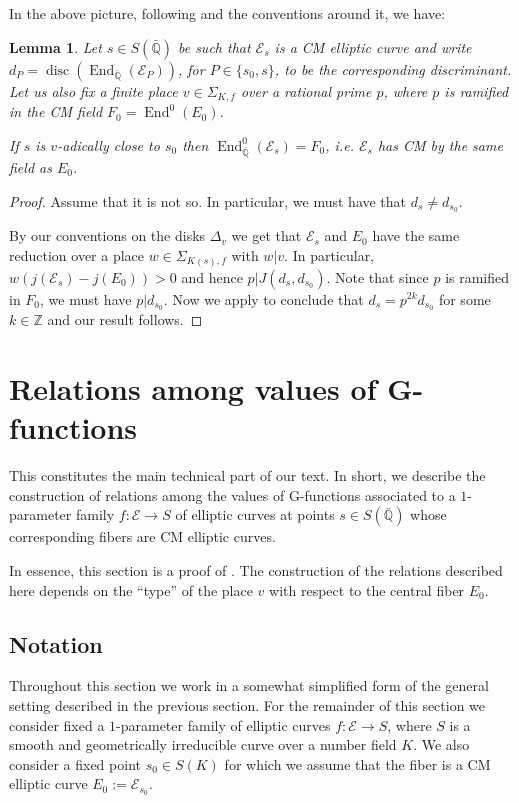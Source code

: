 \documentclass[12pt,twoside,a4paper]{article}
\theoremstyle{plain}%
\newtheorem{lemma}[theorem]{Lemma}
\DeclareMathOperator{\End}{End}
\DeclareMathOperator{\disc}{disc}
\newcommand{\Z}{\mathbb{Z}}
\newcommand{\Q}{\mathbb{Q}}
\newcommand{\CE}{\mathcal{E}}
\begin{document}
In the above picture, following  and the conventions around it, we have:
\begin{lemma}\label{lemproximityramified}
	Let $s\in S(\bar{\Q})$ be such that $\CE_s$ is a CM elliptic curve and write $d_P=\disc(\End_{\bar{\Q}}(\CE_P))$, for $P\in \{s_0,s\}$, to be the corresponding discriminant. Let us also fix a finite place $v\in \Sigma_{K,f}$ over a rational prime $p$, where $p$ is ramified in the CM field $F_0=\End^{0}(E_0)$. 
	
	If $s$ is $v$-adically close to $s_0$ then $\End^{0}_{\bar{\Q}}(\CE_s)=F_0$, i.e. $\CE_s$ has CM by the same field as $E_0$.
\end{lemma}
\begin{proof}
	Assume that it is not so. In particular, we must have that $d_s\neq d_{s_0}$. 
	
	By our conventions on the disks $\Delta_v$ we get that $\CE_s$ and $E_0$ have the same reduction over a place $w\in\Sigma_{K(s),f}$ with $w|v$. In particular, $w(j(\CE_s)-j(E_0))>0$ and hence $p|J(d_s,d_{s_0})$. Note that since $p$ is ramified in $F_0$, we must have $p|d_{s_0}$. Now we apply  to conclude that $d_s=p^{2k}d_{s_0}$ for some $k\in \Z$ and our result follows.
\end{proof}
\section{Relations among values of G-functions}\label{section:cmpadicrels}

This constitutes the main technical part of our text. In short, we describe the construction of relations among the values of G-functions associated to a $1$-parameter family $f:\CE\rightarrow S$ of elliptic curves at points $s\in S(\bar{\Q})$ whose corresponding fibers are CM elliptic curves. 

In essence, this section is a proof of . The construction of the relations described here depends on the ``type'' of the place $v$ with respect to the central fiber $E_0$.

\subsection{Notation}\label{section:finrelsnotation}Throughout this section we work in a somewhat simplified form of the general setting described in the previous section. For the remainder of this section we consider fixed a $1$-parameter family of elliptic curves $f:\CE\rightarrow S$, where $S$ is a smooth and geometrically irreducible curve over a number field $K$. We also consider a fixed point $s_0\in S(K)$ for which we assume that the fiber is a CM elliptic curve $E_0:=\CE_{s_0}$.
\end{document}
